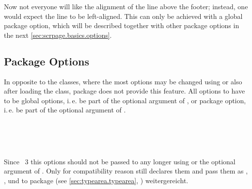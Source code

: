 %
Now not everyone will like the alignment of the line above the footer;
instead, one would expect the line to be left-aligned. This can only
be achieved with a global package option, which will be described
together with other package options in the next
\autoref{sec:scrpage.basics.options}.%
%


\subsection{Package Options}
\label{sec:scrpage.basics.options}

In opposite to the \KOMAScript{} classes, where the most options may be
changed using  or  also after loading the
class, package  does not provide this feature. All options to  have to be global options,
i.\,e. be part of the optional argument of , or
package option, i.\,e. be part of the optional argument of .

\begin{Declaration}
\\
\\
\\
\end{Declaration}%
%
%
Since \KOMAScript~3
this options should not be passed to  any longer using
 or the optional argument of
. Only for compatibility reason  still
declares them and pass them as ,
,  und
 to package  (see
\autoref{sec:typearea.typearea},
) weitergereicht.
%



